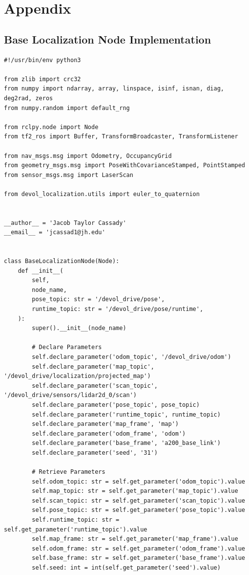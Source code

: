 \section{Appendix}\label{sec:Appendix}

\subsection{Base Localization Node Implementation}\label{subsec:Base implementation}
\begin{verbatim}
#!/usr/bin/env python3

from zlib import crc32
from numpy import ndarray, array, linspace, isinf, isnan, diag, deg2rad, zeros
from numpy.random import default_rng

from rclpy.node import Node
from tf2_ros import Buffer, TransformBroadcaster, TransformListener

from nav_msgs.msg import Odometry, OccupancyGrid
from geometry_msgs.msg import PoseWithCovarianceStamped, PointStamped
from sensor_msgs.msg import LaserScan

from devol_localization.utils import euler_to_quaternion


__author__ = 'Jacob Taylor Cassady'
__email__ = 'jcassad1@jh.edu'


class BaseLocalizationNode(Node):
    def __init__(
        self,
        node_name,
        pose_topic: str = '/devol_drive/pose',
        runtime_topic: str = '/devol_drive/pose/runtime',
    ):
        super().__init__(node_name)

        # Declare Parameters
        self.declare_parameter('odom_topic', '/devol_drive/odom')
        self.declare_parameter('map_topic', '/devol_drive/localization/projected_map')
        self.declare_parameter('scan_topic', '/devol_drive/sensors/lidar2d_0/scan')
        self.declare_parameter('pose_topic', pose_topic)
        self.declare_parameter('runtime_topic', runtime_topic)
        self.declare_parameter('map_frame', 'map')
        self.declare_parameter('odom_frame', 'odom')
        self.declare_parameter('base_frame', 'a200_base_link')
        self.declare_parameter('seed', '31')

        # Retrieve Parameters
        self.odom_topic: str = self.get_parameter('odom_topic').value
        self.map_topic: str = self.get_parameter('map_topic').value
        self.scan_topic: str = self.get_parameter('scan_topic').value
        self.pose_topic: str = self.get_parameter('pose_topic').value
        self.runtime_topic: str = self.get_parameter('runtime_topic').value
        self.map_frame: str = self.get_parameter('map_frame').value
        self.odom_frame: str = self.get_parameter('odom_frame').value
        self.base_frame: str = self.get_parameter('base_frame').value
        self.seed: int = int(self.get_parameter('seed').value)


\end{verbatim}
